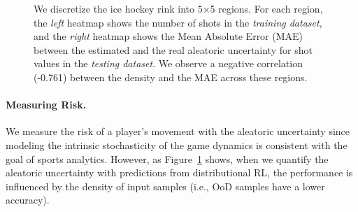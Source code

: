 \documentclass{article}
\begin{document}
\begin{figure}
    \captionsetup{width=.95\linewidth}
    \caption{We discretize the ice hockey rink into 5$\times$5 regions. For each region, the {\it left} heatmap shows the number of shots in the {\it training dataset}, and the {\it right} heatmap shows the Mean Absolute Error (MAE) between the estimated and the real aleatoric uncertainty for shot values in the {\it testing dataset}. We observe a negative correlation (-0.761) between the density and the MAE across these regions.}
    \label{fig:spatial-uncertainty}
    \vspace{-0.2in}
\end{figure}
\paragraph{Measuring Risk.} We measure the risk of a player's movement with the aleatoric uncertainty since modeling the intrinsic stochasticity of the game dynamics is consistent with the goal of sports analytics.
However, as Figure~\ref{fig:spatial-uncertainty} shows, when we quantify the aleatoric uncertainty with predictions from distributional RL, the performance is influenced by the density of input samples (i.e., OoD samples have a lower accuracy). 
\end{document}
